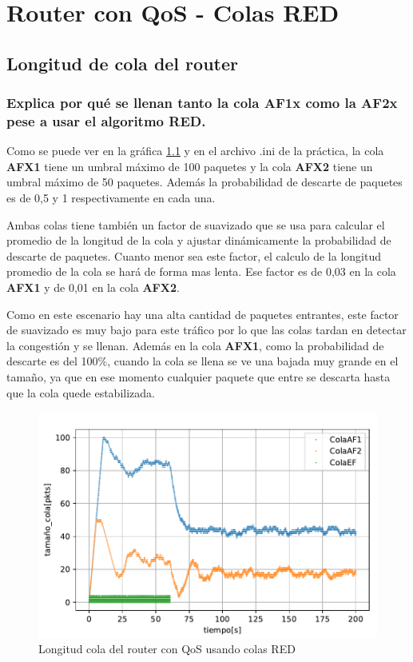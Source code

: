 \chapter{Router con QoS - Colas RED}
\label{chap:colasRED}

\section{Longitud de cola del router}

\subsection{Explica por qué se llenan tanto la cola AF1x como la AF2x pese a usar el algoritmo RED.} \label{chap:ejercicio411}
Como se puede ver en la gráfica \ref{fig:colasRED_tam} y en el archivo .ini de la práctica, la cola \textbf{AFX1} tiene un umbral máximo de 100 paquetes y la cola
\textbf{AFX2} tiene un umbral máximo de 50 paquetes. Además la probabilidad de descarte de paquetes es de 0,5 y 1 respectivamente en cada una.

Ambas colas tiene también un factor de suavizado que se usa para calcular el promedio de la longitud de la cola y ajustar dinámicamente la probabilidad
de descarte de paquetes. Cuanto menor sea este factor, el calculo de la longitud promedio de la cola se hará de forma mas lenta. 
Ese factor es de 0,03 en la cola \textbf{AFX1} y de 0,01 en la cola \textbf{AFX2}.

Como en este escenario hay una alta cantidad de paquetes entrantes, este factor de suavizado es muy bajo para este tráfico por lo que las colas tardan en detectar
la congestión y se llenan. Además en la cola \textbf{AFX1}, como la probabilidad de descarte es del 100\%, cuando la cola se llena se ve una
bajada muy grande en el tamaño, ya que en ese momento cualquier paquete que entre se descarta hasta que la cola quede estabilizada. 


\begin{figure}[!ht]
    \centering
    \includegraphics{graficas/RED/tamao_cola_red.pdf}
    \caption{Longitud cola del router con QoS usando colas RED}
    \label{fig:colasRED_tam}
\end{figure}


